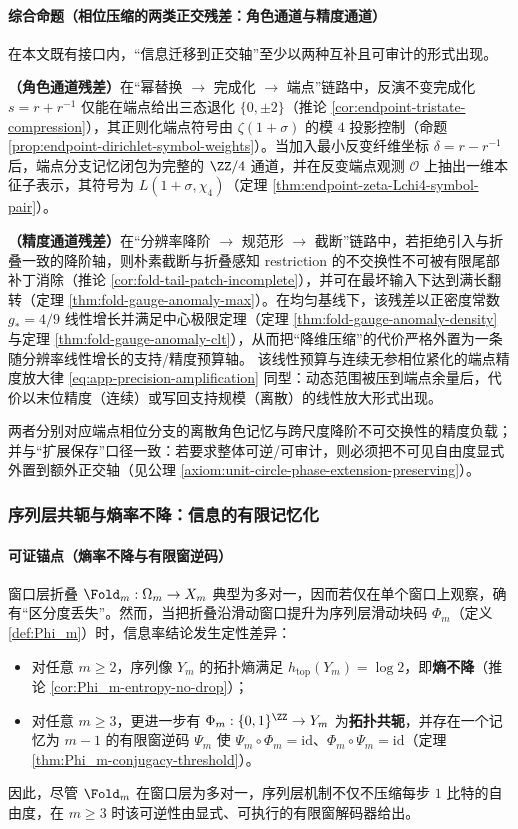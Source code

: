 \paragraph{综合命题（相位压缩的两类正交残差：角色通道与精度通道）}
在本文既有接口内，“信息迁移到正交轴”至少以两种互补且可审计的形式出现。
\par
\textbf{（角色通道残差）}在“幂替换 \(\to\) 完成化 \(\to\) 端点”链路中，反演不变完成化 \(s=r+r^{-1}\) 仅能在端点给出三态退化 \(\{0,\pm 2\}\)（推论 \ref{cor:endpoint-tristate-compression}），其正则化端点符号由 \(\zeta(1+\sigma)\) 的模 \(4\) 投影控制（命题 \ref{prop:endpoint-dirichlet-symbol-weights}）。当加入最小反变纤维坐标 \(\delta=r-r^{-1}\) 后，端点分支记忆闭包为完整的 \(\ZZ/4\) 通道，并在反变端点观测 \(\mathcal O\) 上抽出一维本征子表示，其符号为 \(L(1+\sigma,\chi_4)\)（定理 \ref{thm:endpoint-zeta-Lchi4-symbol-pair}）。
\par
\textbf{（精度通道残差）}在“分辨率降阶 \(\to\) 规范形 \(\to\) 截断”链路中，若拒绝引入与折叠一致的降阶轴，则朴素截断与折叠感知 restriction 的不交换性不可被有限尾部补丁消除（推论 \ref{cor:fold-tail-patch-incomplete}），并可在最坏输入下达到满长翻转（定理 \ref{thm:fold-gauge-anomaly-max}）。在均匀基线下，该残差以正密度常数 \(g_\ast=4/9\) 线性增长并满足中心极限定理（定理 \ref{thm:fold-gauge-anomaly-density} 与定理 \ref{thm:fold-gauge-anomaly-clt}），从而把“降维压缩”的代价严格外置为一条随分辨率线性增长的支持/精度预算轴。
该线性预算与连续无参相位紧化的端点精度放大律 \eqref{eq:app-precision-amplification} 同型：动态范围被压到端点余量后，代价以末位精度（连续）或写回支持规模（离散）的线性放大形式出现。
\par
两者分别对应端点相位分支的离散角色记忆与跨尺度降阶不可交换性的精度负载；并与“扩展保存”口径一致：若要求整体可逆/可审计，则必须把不可见自由度显式外置到额外正交轴（见公理 \ref{axiom:unit-circle-phase-extension-preserving}）。

\subsubsection{序列层共轭与熵率不降：信息的有限记忆化}\label{subsubsec:insight-entropy-memory}
\paragraph{可证锚点（熵率不降与有限窗逆码）}
窗口层折叠 \(\Fold_m:\Omega_m\to X_m\) 典型为多对一，因而若仅在单个窗口上观察，确有“区分度丢失”。然而，当把折叠沿滑动窗口提升为序列层滑动块码 \(\Phi_m\)（定义 \ref{def:Phi_m}）时，信息率结论发生定性差异：
\begin{itemize}
  \item 对任意 \(m\ge 2\)，序列像 \(Y_m\) 的拓扑熵满足 \(h_{\mathrm{top}}(Y_m)=\log 2\)，即\textbf{熵不降}（推论 \ref{cor:Phi_m-entropy-no-drop}）；
  \item 对任意 \(m\ge 3\)，更进一步有 \(\Phi_m:\{0,1\}^{\ZZ}\to Y_m\) 为\textbf{拓扑共轭}，并存在一个记忆为 \(m-1\) 的有限窗逆码 \(\Psi_m\) 使 \(\Psi_m\circ\Phi_m=\mathrm{id}\)、\(\Phi_m\circ\Psi_m=\mathrm{id}\)（定理 \ref{thm:Phi_m-conjugacy-threshold}）。
\end{itemize}
因此，尽管 \(\Fold_m\) 在窗口层为多对一，序列层机制不仅不压缩每步 \(1\) 比特的自由度，在 \(m\ge 3\) 时该可逆性由显式、可执行的有限窗解码器给出。

